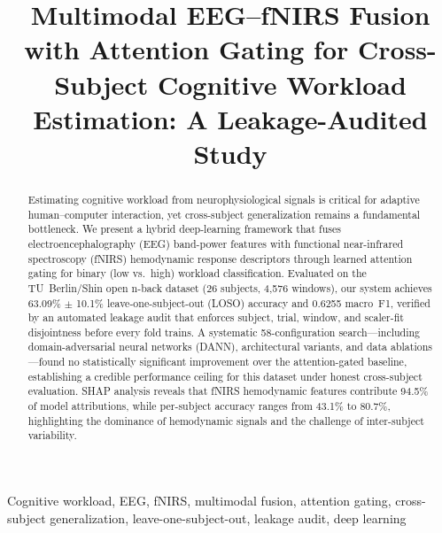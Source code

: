 \documentclass[conference]{IEEEtran}
\begin{document}
\title{Multimodal EEG--fNIRS Fusion with Attention Gating for Cross-Subject Cognitive Workload Estimation: A Leakage-Audited Study}

\author{
}

\maketitle

\begin{abstract}
Estimating cognitive workload from neurophysiological signals is critical for adaptive human--computer interaction, yet cross-subject generalization remains a fundamental bottleneck. We present a hybrid deep-learning framework that fuses electroencephalography (EEG) band-power features with functional near-infrared spectroscopy (fNIRS) hemodynamic response descriptors through learned attention gating for binary (low vs.\ high) workload classification. Evaluated on the TU~Berlin/Shin open n-back dataset (26 subjects, 4,576 windows), our system achieves 63.09\% $\pm$ 10.1\% leave-one-subject-out (LOSO) accuracy and 0.6255 macro~F1, verified by an automated leakage audit that enforces subject, trial, window, and scaler-fit disjointness before every fold trains. A systematic 58-configuration search---including domain-adversarial neural networks (DANN), architectural variants, and data ablations---found no statistically significant improvement over the attention-gated baseline, establishing a credible performance ceiling for this dataset under honest cross-subject evaluation. SHAP analysis reveals that fNIRS hemodynamic features contribute 94.5\% of model attributions, while per-subject accuracy ranges from 43.1\% to 80.7\%, highlighting the dominance of hemodynamic signals and the challenge of inter-subject variability.
\end{abstract}

\begin{IEEEkeywords}
Cognitive workload, EEG, fNIRS, multimodal fusion, attention gating, cross-subject generalization, leave-one-subject-out, leakage audit, deep learning
\end{IEEEkeywords}
\end{document}
